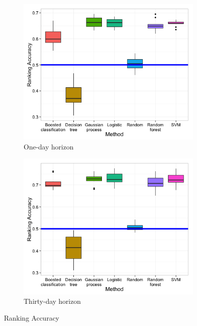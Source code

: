 \documentclass[twocolumn]{article}
\begin{document}
\begin{figure}
    \centering
    \begin{subfigure}{0.45\textwidth}
        \centering
        \includegraphics[width=\linewidth]{figures/performance-sample-5000-OneDayHorizon.png}
        \caption{One-day horizon}
    \end{subfigure}
    \begin{subfigure}{0.45\textwidth}
        \centering
        \includegraphics[width=\linewidth]{figures/performance-sample-5000-OneMonthHorizon.png}
        \caption{Thirty-day horizon}
    \end{subfigure}
    \caption{Ranking Accuracy}
    \label{fig:ranking-accuracy}
\end{figure}
\end{document}
